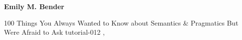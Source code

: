 \begin{bio}
  {\bfseries Emily M. Bender} 
  
\end{bio}

\begin{tutorial}
  {100 Things You Always Wanted to Know about Semantics \& Pragmatics But Were Afraid to Ask}
  {tutorial-012}
  {\daydateyear, \tutorialmorningtime}
  {\TutLocA}


\end{tutorial}
